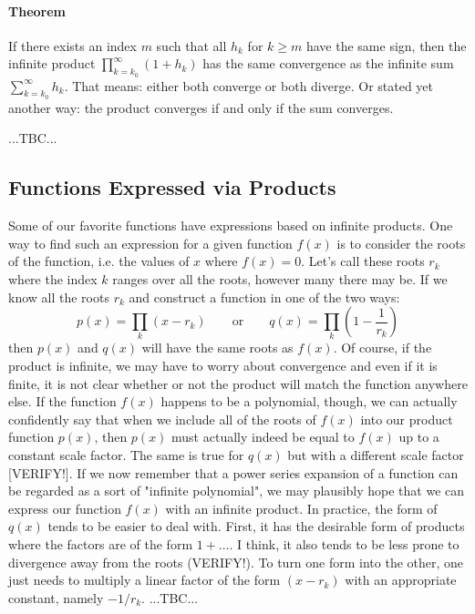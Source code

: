 \paragraph{Theorem} If there exists an index $m$ such that all $h_k$ for $k \geq m$ have the same sign, then the infinite product $\prod_{k=k_0}^{\infty} (1 + h_k)$ has the same convergence as the infinite sum $\sum_{k=k_0}^{\infty} h_k$. That means: either both converge or both diverge. Or stated yet another way: the product converges if and only if the sum converges. 


...TBC...






\subsection{Functions Expressed via Products}
Some of our favorite functions have expressions based on infinite products. One way to find such an expression for a given function $f(x)$ is to consider the roots of the function, i.e. the values of $x$ where $f(x) = 0$. Let's call these roots $r_k$ where the index $k$ ranges over all the roots, however many there may be. If we know all the roots $r_k$ and construct a function in one of the two ways:
\begin{equation}
 p(x) = \prod_{k} (x - r_k)  \qquad \text{or} \qquad
 q(x) = \prod_{k} (1 - \frac{1}{r_k})
\end{equation}
then $p(x)$ and $q(x)$ will have the same roots as $f(x)$. Of course, if the product is infinite, we may have to worry about convergence and even if it is finite, it is not clear whether or not the product will match the function anywhere else. If the function $f(x)$ happens to be a polynomial, though, we can actually confidently say that when we include all of the roots of $f(x)$ into our product function $p(x)$, then $p(x)$ must actually indeed be equal to $f(x)$ up to a constant scale factor. The same is true for $q(x)$ but with a different scale factor [VERIFY!]. If we now remember that a power series expansion of a function can be regarded as a sort of "infinite polynomial", we may plausibly hope that we can express our function $f(x)$ with an infinite product. In practice, the form of $q(x)$ tends to be easier to deal with. First, it has the desirable form of products where the factors are of the form $1 + \ldots$. I think, it also tends to be less prone to divergence away from the roots (VERIFY!). To turn one form into the other, one just needs to multiply a linear factor of the form $(x - r_k)$ with an appropriate constant, namely $-1 / r_k$. ...TBC...

